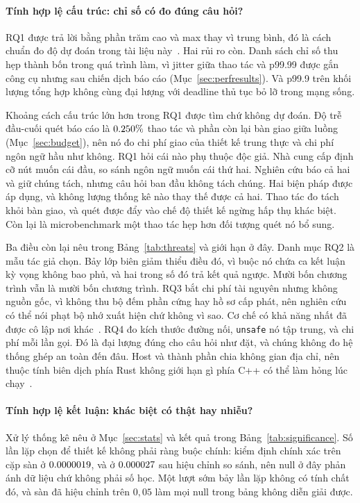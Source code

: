 \paragraph{Tính hợp lệ cấu trúc: chỉ số có đo đúng câu hỏi?}
RQ1 được trả lời bằng phần trăm cao và max thay vì trung bình, đó là cách
chuẩn đo độ dự đoán trong tài liệu này~\cite{dean2013tail}. Hai rủi ro còn. Danh sách
chỉ số thu hẹp thành bốn trong quá trình làm, vì jitter giữa thao tác và p99.99
được gắn công cụ nhưng sau chiến dịch báo cáo (Mục~\ref{sec:perfresults}). Và p99.9 trên
khối lượng tổng hợp không cùng đại lượng với deadline thủ tục bỏ lỡ trong mạng sống.

Khoảng cách cấu trúc lớn hơn trong RQ1 được tìm chứ không dự đoán. Độ trễ đầu-cuối
quét báo cáo là $0.250\%$ thao tác và phần còn lại bàn giao giữa luồng
(Mục~\ref{sec:budget}), nên nó đo chi phí giao của thiết kế trung thực và
chi phí ngôn ngữ hầu như không. RQ1 hỏi cái nào phụ thuộc độc giả. Nhà cung cấp
định cỡ nút muốn cái đầu, so sánh ngôn ngữ muốn cái thứ hai. Nghiên cứu báo cả hai và giữ
chúng tách, nhưng câu hỏi ban đầu không tách chúng. Hai biện pháp được
áp dụng, và không lượng thống kê nào thay thế được cả hai. Thao tác đo tách
khỏi bàn giao, và quét được đẩy vào chế độ thiết kế ngừng hấp thụ
khác biệt. Còn lại là microbenchmark một thao tác hẹp hơn đối tượng
quét nó bổ sung.

Ba điều còn lại nêu trong Bảng~\ref{tab:threats} và giới hạn ở đây. Danh mục RQ2 là
mẫu tác giả chọn. Bảy lớp biên giảm thiểu điều đó, vì buộc nó
chứa ca kết luận kỳ vọng không bao phủ, và hai trong số đó trả kết quả
ngược. Mười bốn chương trình vẫn là mười bốn chương trình. RQ3 bắt chi phí tài nguyên nhưng không nguồn gốc, vì không thu bộ đếm phần cứng hay hồ sơ cấp phát, nên nghiên cứu có thể nói phạt bộ nhớ
xuất hiện chứ không vì sao. Cơ chế có khả năng nhất đã được cô lập
nơi khác~\cite{zhang2022runtime,harris2023morello}. RQ4 đo kích thước đường nối,
\texttt{unsafe} nó tập trung, và chi phí mỗi lần gọi. Đó là đại lượng đúng cho
câu hỏi như đặt, và chúng không đo hệ thống ghép an toàn đến đâu. Host và
thành phần chia không gian địa chỉ, nên thuộc tính biên dịch phía Rust không giới hạn gì
phía C++ có thể làm hỏng lúc chạy~\cite{rivera2021galeed,kirth2022pkrusafe}.

\paragraph{Tính hợp lệ kết luận: khác biệt có thật hay nhiễu?}
Xử lý thống kê nêu ở Mục~\ref{sec:stats} và kết quả trong
Bảng~\ref{tab:significance}. Số lần lặp chọn để thiết kế không phải ràng buộc chính: kiểm định chính xác trên \NRepeats{} cặp sàn ở $0.0000019$, và ở
$0.000027$ sau hiệu chỉnh \NTests{} so sánh, nên null ở đây phản ánh dữ liệu chứ không
phải số học. Một lượt sớm bảy lần lặp không có tính chất đó, và
sàn đã hiệu chỉnh trên $0{,}05$ làm mọi null trong bảng không diễn giải được.

